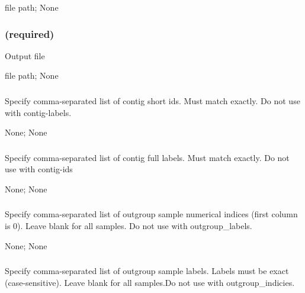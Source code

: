 \documentclass[letterpaper,11pt,english]{sphinxmanual}
\begin{document}
 file path;  None


\subsubsection{ (required)}
\label{\detokenize{prog_desc:id57}}
 Output file

 file path;  None


\subsubsection{}
\label{\detokenize{prog_desc:id58}}
 Specify comma-separated list of contig short ids. Must match exactly. Do not use with \textendash{}contig-labels.

 None;  None


\subsubsection{}
\label{\detokenize{prog_desc:id59}}
 Specify comma-separated list of contig full labels. Must match exactly. Do not use with \textendash{}contig-ids

 None;  None


\subsubsection{}
\label{\detokenize{prog_desc:outgroup-indices-outgroupindices}}
 Specify comma-separated list of outgroup sample numerical indices (first column is 0). Leave blank for all samples. Do not use with \textendash{}outgroup\_labels.

 None;  None


\subsubsection{}
\label{\detokenize{prog_desc:outgroup-labels-outgrouplabels}}
 Specify comma-separated list of outgroup sample labels. Labels must be exact (case-sensitive). Leave blank for all samples.Do not use with \textendash{}outgroup\_indicies.
\end{document}
